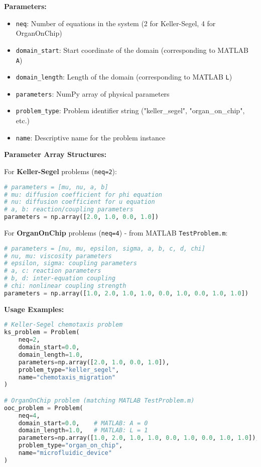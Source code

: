 \textbf{Parameters:}
\begin{itemize}
    \item \texttt{neq}: Number of equations in the system (2 for Keller-Segel, 4 for OrganOnChip)
    \item \texttt{domain\_start}: Start coordinate of the domain (corresponding to MATLAB \texttt{A})
    \item \texttt{domain\_length}: Length of the domain (corresponding to MATLAB \texttt{L})
    \item \texttt{parameters}: NumPy array of physical parameters
    \item \texttt{problem\_type}: Problem identifier string ("keller\_segel", "organ\_on\_chip", etc.)
    \item \texttt{name}: Descriptive name for the problem instance
\end{itemize}

\textbf{Parameter Array Structures:}

For \textbf{Keller-Segel} problems (\texttt{neq=2}):
\begin{lstlisting}[language=Python, caption=Keller-Segel Parameters]
# parameters = [mu, nu, a, b]
# mu: diffusion coefficient for phi equation  
# nu: diffusion coefficient for u equation
# a, b: reaction/coupling parameters
parameters = np.array([2.0, 1.0, 0.0, 1.0])
\end{lstlisting}

For \textbf{OrganOnChip} problems (\texttt{neq=4}) - from MATLAB \texttt{TestProblem.m}:
\begin{lstlisting}[language=Python, caption=OrganOnChip Parameters]
# parameters = [nu, mu, epsilon, sigma, a, b, c, d, chi]
# nu, mu: viscosity parameters
# epsilon, sigma: coupling parameters
# a, c: reaction parameters  
# b, d: inter-equation coupling
# chi: nonlinear coupling strength
parameters = np.array([1.0, 2.0, 1.0, 1.0, 0.0, 1.0, 0.0, 1.0, 1.0])
\end{lstlisting}

\textbf{Usage Examples:}
\begin{lstlisting}[language=Python, caption=Problem Creation Examples]
# Keller-Segel chemotaxis problem
ks_problem = Problem(
    neq=2,
    domain_start=0.0,
    domain_length=1.0,
    parameters=np.array([2.0, 1.0, 0.0, 1.0]),
    problem_type="keller_segel",
    name="chemotaxis_migration"
)

# OrganOnChip problem (matching MATLAB TestProblem.m)
ooc_problem = Problem(
    neq=4,
    domain_start=0.0,    # MATLAB: A = 0
    domain_length=1.0,   # MATLAB: L = 1
    parameters=np.array([1.0, 2.0, 1.0, 1.0, 0.0, 1.0, 0.0, 1.0, 1.0]),
    problem_type="organ_on_chip",
    name="microfluidic_device"
)
\end{lstlisting}

